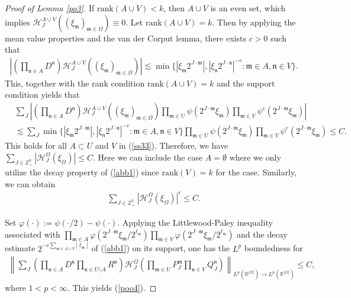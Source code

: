 \documentclass[11 pt,letterpaper]{amsart}
\theoremstyle{plain}
\theoremstyle{definition}
\theoremstyle{remark} \theoremstyle{exam} \theoremstyle{ob}
\numberwithin{equation}{section}
\begin{document}
\begin{proof}[Proof of Lemma \ref{po3}]
	If $\text{rank}(A\cup V)<k$, then $A\cup V$ is an even set, which implies $\mathcal{H}_J^{A\cup V} \left((\xi_{\mathfrak{m}} )_{\mathfrak{m}\in \Omega} \right) \equiv 0$.
	Let $\text{rank}(A\cup V)=k$. Then by applying the mean value properties and the van der Corput lemma, there exists  $c>0$ such that
	\begin{align}\label{abb1}
		\left| \left( \prod_{\mathfrak{n}\in   A} D^{\mathfrak{n}} \right)\mathcal{H}_J^{A\cup V} \left((\xi_{\mathfrak{m}} )_{\mathfrak{m}\in \Omega} \right)\right|\lesssim \min\{ |\xi_{\mathfrak{m}}2^{J\cdot \mathfrak{m}}|, |\xi_{\mathfrak{n}}2^{J\cdot \mathfrak{n}}|^{-c}: \mathfrak{m}\in A, \mathfrak{n}\in V\}.
	\end{align}
This, together with the rank condition $\text{rank}(A\cup V)=k$ and the support condition yields that
	\begin{align*}
		&\sum_{J}\left| \left( \prod_{\mathfrak{n}\in   A} D^{\mathfrak{n}} \right)\mathcal{H}_J^{A\cup V} \left((\xi_{\mathfrak{m}} )_{\mathfrak{m}\in \Omega} \right) \prod_{\mathfrak{m}\in U}  \psi \left(2^{J\cdot \mathfrak{m}} \xi_{\mathfrak{m}} \right)    \prod_{\mathfrak{m}\in V}\psi^c\left(2^{J\cdot \mathfrak{m}} \xi_{\mathfrak{m}} \right)  \right|\\
		& \lesssim  \sum_J   \min\{ |\xi_{\mathfrak{m}}2^{J\cdot \mathfrak{m}}|, |\xi_{\mathfrak{n}}2^{J\cdot \mathfrak{n}}|^{-c}: \mathfrak{m}\in A, \mathfrak{n}\in V\}\prod_{\mathfrak{m}\in U}  \psi \left(2^{J\cdot \mathfrak{m}} \xi_{\mathfrak{m}} \right)    \prod_{\mathfrak{m}\in V}\psi^c\left(2^{J\cdot \mathfrak{m}} \xi_{\mathfrak{m}} \right)\le C.
	\end{align*}
	This holds for all $A\subset U$ and $V$ in (\ref{ss33}).  Therefore, we have $\sum_{J \in \mathbb{Z}_+^k}  |\mathcal{H}^{\Omega}_{J}(\xi_{\Omega}) |  \le C. $ Here we can include the case $A=\emptyset$ where we only utilize the decay property of (\ref{abb1}) since $\text{rank}(V)= k$ for the case. Similarly, we can obtain 	\begin{align*}
		\sum_{J\in \mathbb{Z}_+^k}   |\mathcal{H}^{\Omega}_{J}(\xi_{\Omega}) |^{\epsilon} \le C. 
	\end{align*} 
	
	 Set $\varphi(\cdot):=\psi(\cdot/2)-\psi(\cdot)$.  Applying the Littlewood-Paley inequality associated with $\prod_{\mathfrak{m}\in A}  \varphi \left(2^{J\cdot \mathfrak{m}} \xi_{\mathfrak{m}} /2^{\ell_{\mathfrak{m}}}\right)    \prod_{\mathfrak{m}\in V}\varphi \left(2^{J\cdot \mathfrak{m}} \xi_{\mathfrak{m}}/2^{\ell_{\mathfrak{m}}} \right)$
	and the decay estimate $2^{-c\sum_{\mathfrak{m}\in A\cup V} |\ell_{\mathfrak{m}}|}$ of  (\ref{abb1})    on its  support, one has  the $L^p$ boundedness for
	\begin{align}
		\left\|\sum_{J} \left(\prod_{\mathfrak{n}\in   A} D^{\mathfrak{n}}\prod_{\mathfrak{n}\in U\setminus A} R^{\mathfrak{n}}\right)\mathcal{H}^{\Omega}_J \left(\prod_{\mathfrak{m}\in U}  P_J^{\mathfrak{m}}  \prod_{\mathfrak{n}\in V}Q_J^{\mathfrak{n}}\right) \right\|_{L^p(\mathbb{R}^{|\Omega|})\rightarrow L^p(\mathbb{R}^{|\Omega|})}\le C,
	\end{align}
	where $1<p<\infty$. This   yields (\ref{poo4}).
\end{proof}
\end{document}
